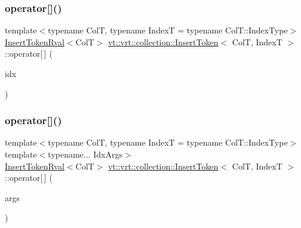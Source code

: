 \mbox{\label{structvt_1_1vrt_1_1collection_1_1_insert_token_a1c811d4801cb1a4acde384d19bead046}} 
\subsubsection{\texorpdfstring{operator[]()}{operator[]()}\hspace{0.1cm}{\footnotesize\ttfamily [1/2]}}
{\footnotesize\ttfamily template$<$typename ColT, typename IndexT = typename Col\+T\+::\+Index\+Type$>$ \\
\hyperlink{structvt_1_1vrt_1_1collection_1_1_insert_token_rval}{Insert\+Token\+Rval}$<$ColT$>$ \hyperlink{structvt_1_1vrt_1_1collection_1_1_insert_token}{vt\+::vrt\+::collection\+::\+Insert\+Token}$<$ ColT, IndexT $>$\+::operator\mbox{[}$\,$\mbox{]} (\begin{DoxyParamCaption}\item[{IndexT \&\&}]{idx }\end{DoxyParamCaption})\hspace{0.3cm}{\ttfamily [inline]}}

\mbox{\label{structvt_1_1vrt_1_1collection_1_1_insert_token_a9021d105041cb56111f8961c88d1ca49}} 
\subsubsection{\texorpdfstring{operator[]()}{operator[]()}\hspace{0.1cm}{\footnotesize\ttfamily [2/2]}}
{\footnotesize\ttfamily template$<$typename ColT, typename IndexT = typename Col\+T\+::\+Index\+Type$>$ \\
template$<$typename... Idx\+Args$>$ \\
\hyperlink{structvt_1_1vrt_1_1collection_1_1_insert_token_rval}{Insert\+Token\+Rval}$<$ColT$>$ \hyperlink{structvt_1_1vrt_1_1collection_1_1_insert_token}{vt\+::vrt\+::collection\+::\+Insert\+Token}$<$ ColT, IndexT $>$\+::operator\mbox{[}$\,$\mbox{]} (\begin{DoxyParamCaption}\item[{Idx\+Args \&\&...}]{args }\end{DoxyParamCaption})\hspace{0.3cm}{\ttfamily [inline]}}



